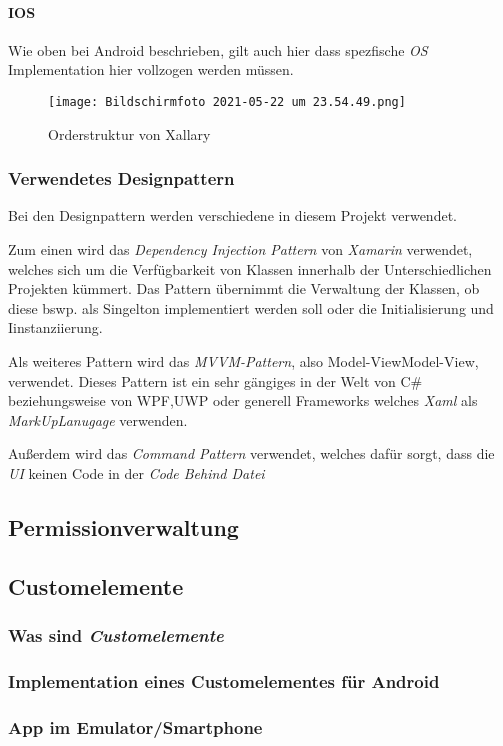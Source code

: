 \paragraph{IOS} Wie oben bei Android beschrieben, gilt auch hier dass spezfische \textit{OS} Implementation hier vollzogen werden müssen.
\begin{figure}[h]
    \centering
    \texttt{[image: Bildschirmfoto 2021-05-22 um 23.54.49.png]}
    \label{fig:Ordnerstruktur}
    \caption{Orderstruktur von Xallary}
\end{figure}
\subsubsection{Verwendetes Designpattern}
Bei den Designpattern werden verschiedene in diesem Projekt verwendet. 

Zum einen wird das 
\textit{Dependency Injection Pattern} von \textit{Xamarin} verwendet, welches sich um die Verfügbarkeit von Klassen innerhalb
der Unterschiedlichen Projekten kümmert. Das Pattern übernimmt die Verwaltung der Klassen, ob diese bswp. als Singelton implementiert werden soll oder
die Initialisierung und Iinstanziierung.

Als weiteres Pattern wird das \textit{MVVM-Pattern}, also Model-ViewModel-View, verwendet.
Dieses Pattern ist ein sehr gängiges in der Welt von C\# beziehungsweise von WPF,UWP oder generell Frameworks welches \textit{Xaml} als 
\textit{MarkUpLanugage} verwenden.

Außerdem wird das \textit{Command Pattern} verwendet, welches dafür sorgt, dass die \textit{UI} keinen Code
in der \textit{Code Behind Datei}
\subsection{Permissionverwaltung}

\subsection{Customelemente}
\subsubsection{Was sind \textit{Customelemente}}
\subsubsection{Implementation eines Customelementes für Android}
\subsubsection{App im Emulator/Smartphone}